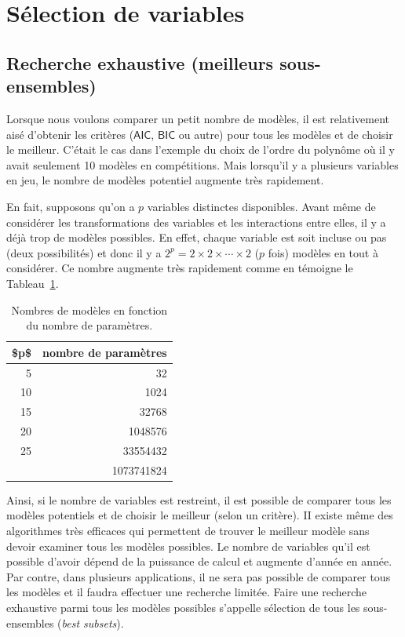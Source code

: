 \documentclass[
  11pt,
  letterpaper,
]{scrbook}
\theoremstyle{definition}
\theoremstyle{remark}
\begin{document}
\section{Sélection de variables}\label{suxe9lection-de-variables}

\subsection{Recherche exhaustive (meilleurs
sous-ensembles)}\label{recherche-exhaustive-meilleurs-sous-ensembles}

Lorsque nous voulons comparer un petit nombre de modèles, il est
relativement aisé d'obtenir les critères (\(\mathsf{AIC}\),
\(\mathsf{BIC}\) ou autre) pour tous les modèles et de choisir le
meilleur. C'était le cas dans l'exemple du choix de l'ordre du polynôme
où il y avait seulement 10 modèles en compétitions. Mais lorsqu'il y a
plusieurs variables en jeu, le nombre de modèles potentiel augmente très
rapidement.

En fait, supposons qu'on a \(p\) variables distinctes disponibles. Avant
même de considérer les transformations des variables et les interactions
entre elles, il y a déjà trop de modèles possibles. En effet, chaque
variable est soit incluse ou pas (deux possibilités) et donc il y a
\(2^p=2\times 2 \times \cdots \times 2\) (\(p\) fois) modèles en tout à
considérer. Ce nombre augmente très rapidement comme en témoigne le
Tableau~\ref{tbl-02-table3}.

\begin{longtable}[t]{rr}

\caption{\label{tbl-02-table3}Nombres de modèles en fonction du nombre
de paramètres.}

\tabularnewline

\toprule
\$p\$ & nombre de paramètres\\
\midrule
5 & 32\\
10 & 1024\\
15 & 32768\\
20 & 1048576\\
25 & 33554432\\
\addlinespace
30 & 1073741824\\
\bottomrule

\end{longtable}

Ainsi, si le nombre de variables est restreint, il est possible de
comparer tous les modèles potentiels et de choisir le meilleur (selon un
critère). II existe même des algorithmes très efficaces qui permettent
de trouver le meilleur modèle sans devoir examiner tous les modèles
possibles. Le nombre de variables qu'il est possible d'avoir dépend de
la puissance de calcul et augmente d'année en année. Par contre, dans
plusieurs applications, il ne sera pas possible de comparer tous les
modèles et il faudra effectuer une recherche limitée. Faire une
recherche exhaustive parmi tous les modèles possibles s'appelle
sélection de tous les sous-ensembles (\emph{best subsets}).
\end{document}

